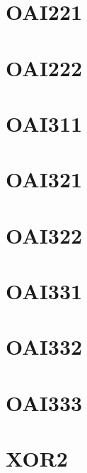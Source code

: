 \documentclass[10pt,a4paper,twoside]{report}
\begin{document}
\section{OAI221}

\clearpage

\section{OAI222}

\clearpage

\section{OAI311}

\clearpage

\section{OAI321}

\clearpage

\section{OAI322}

\clearpage

\section{OAI331}

\clearpage

\section{OAI332}

\clearpage

\section{OAI333}

\clearpage


\section{XOR2}

\clearpage
\end{document}
